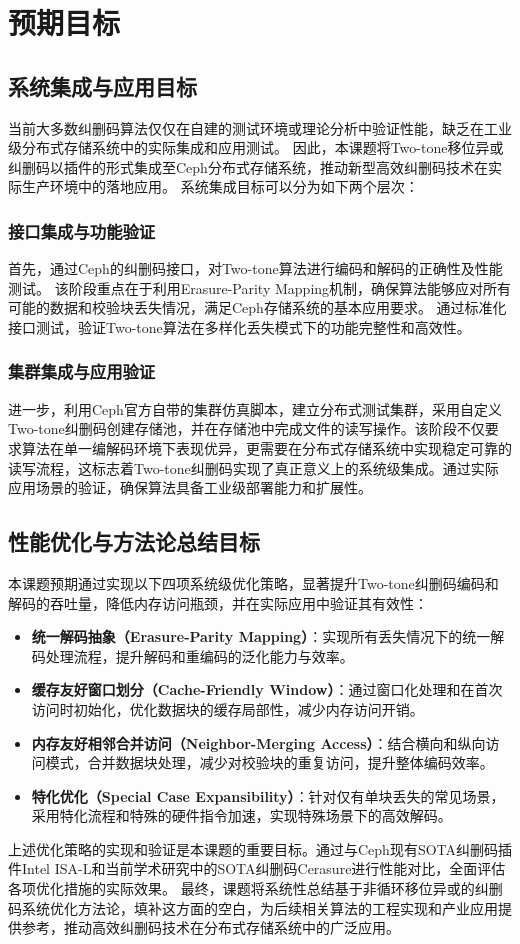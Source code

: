 
\chapter{预期目标}

\section{系统集成与应用目标}

当前大多数纠删码算法仅仅在自建的测试环境或理论分析中验证性能，缺乏在工业级分布式存储系统中的实际集成和应用测试。
因此，本课题将Two-tone移位异或纠删码以插件的形式集成至Ceph分布式存储系统，推动新型高效纠删码技术在实际生产环境中的落地应用。
系统集成目标可以分为如下两个层次：

\subsection{接口集成与功能验证}

首先，通过Ceph的纠删码接口，对Two-tone算法进行编码和解码的正确性及性能测试。
该阶段重点在于利用Erasure-Parity Mapping机制，确保算法能够应对所有可能的数据和校验块丢失情况，满足Ceph存储系统的基本应用要求。
通过标准化接口测试，验证Two-tone算法在多样化丢失模式下的功能完整性和高效性。

\subsection{集群集成与应用验证}

进一步，利用Ceph官方自带的集群仿真脚本，建立分布式测试集群，采用自定义Two-tone纠删码创建存储池，并在存储池中完成文件的读写操作。该阶段不仅要求算法在单一编解码环境下表现优异，更需要在分布式存储系统中实现稳定可靠的读写流程，这标志着Two-tone纠删码实现了真正意义上的系统级集成。通过实际应用场景的验证，确保算法具备工业级部署能力和扩展性。

\section{性能优化与方法论总结目标}

本课题预期通过实现以下四项系统级优化策略，显著提升Two-tone纠删码编码和解码的吞吐量，降低内存访问瓶颈，并在实际应用中验证其有效性：

\begin{itemize}
    \item \textbf{统一解码抽象（Erasure-Parity Mapping）}：实现所有丢失情况下的统一解码处理流程，提升解码和重编码的泛化能力与效率。
    \item \textbf{缓存友好窗口划分（Cache-Friendly Window）}：通过窗口化处理和在首次访问时初始化，优化数据块的缓存局部性，减少内存访问开销。
    \item \textbf{内存友好相邻合并访问（Neighbor-Merging Access）}：结合横向和纵向访问模式，合并数据块处理，减少对校验块的重复访问，提升整体编码效率。
    \item \textbf{特化优化（Special Case Expansibility）}：针对仅有单块丢失的常见场景，采用特化流程和特殊的硬件指令加速，实现特殊场景下的高效解码。
\end{itemize}

上述优化策略的实现和验证是本课题的重要目标。通过与Ceph现有SOTA纠删码插件Intel ISA-L和当前学术研究中的SOTA纠删码Cerasure进行性能对比，全面评估各项优化措施的实际效果。
最终，课题将系统性总结基于非循环移位异或的纠删码系统优化方法论，填补这方面的空白，为后续相关算法的工程实现和产业应用提供参考，推动高效纠删码技术在分布式存储系统中的广泛应用。